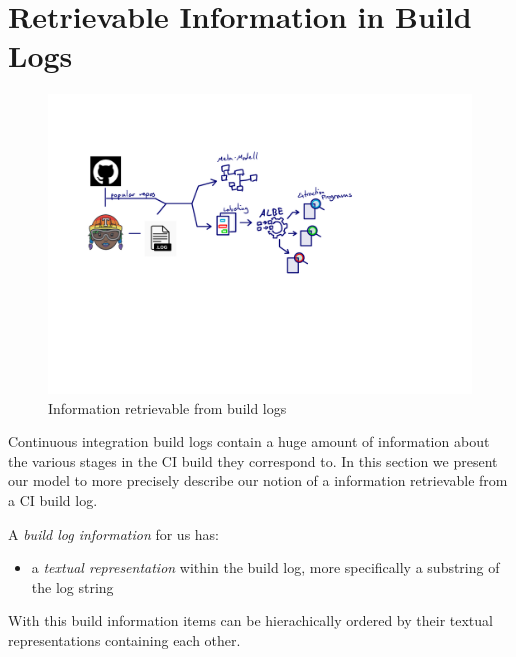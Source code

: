 \documentclass[\myrootdir/main.tex]{subfiles}
\begin{document}
\section{Retrievable Information in Build Logs}
\begin{figure}[h]
  \centering
\includegraphics[page=2, width=\textwidth, trim={0.5cm 0.5cm 0.5cm 0.5cm}, clip]{img/flow-of-research.pdf}
  \caption{Information retrievable from build logs}
  \label{fig:build-log-information-draft}
\end{figure}
Continuous integration build logs contain a huge amount of information about the various stages in the CI build they correspond to. In this section we present our model to more precisely describe our notion of a information retrievable from a CI build log.

A \emph{build log information} for us has:
\begin{itemize}
	\item a \emph{textual representation} within the build log, more specifically a substring of the log string
\end{itemize}
With this build information items can be hierachically ordered by their textual representations containing each other.
\end{document}
